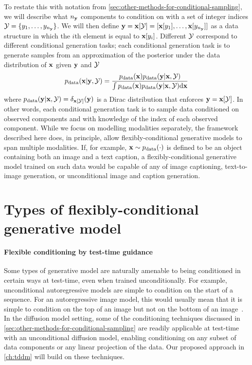 To restate this with notation from \cref{sec:other-methods-for-conditional-sampling}, we will describe what $n_{\mathbf{y}}$ components to condition on with a set of integer indices ${\mathcal{Y}} = \{ y_1, \ldots, y_{n_{\mathbf{y}}} \}$. We will then define ${\mathbf{y}} = {\mathbf{x}}[{\mathcal{Y}}] = [ {\mathbf{x}}[y_1], \ldots, {\mathbf{x}}[y_{n_{\mathbf{y}}}] ]$ as a data structure in which the $i$th element is equal to ${\mathbf{x}}[y_i]$. Different ${\mathcal{Y}}$ correspond to different conditional generation tasks; each conditional generation task is to generate samples from an approximation of the posterior under the data distribution of ${\mathbf{x}}$ given ${\mathbf{y}}$ and ${\mathcal{Y}}$
\begin{equation} \label{eq:flexible-diffusion-target}
    p_{\rm{data}}({\mathbf{x}} | {\mathbf{y}}, {\mathcal{Y}}) = \frac{p_{\rm{data}}({\mathbf{x}})p_{\rm{data}}({\mathbf{y}}|{\mathbf{x}},{\mathcal{Y}})}{\int p_{\rm{data}}({\mathbf{x}})p_{\rm{data}}({\mathbf{y}}|{\mathbf{x}},{\mathcal{Y}}) \mathrm{d}{\mathbf{x}}} 
\end{equation}
where $p_{\rm{data}}({\mathbf{y}}|{\mathbf{x}},{\mathcal{Y}}) = \delta_{{\mathbf{x}}[{\mathcal{Y}}]}({\mathbf{y}})$ is a Dirac distribution that enforces ${\mathbf{y}} = {\mathbf{x}}[{\mathcal{Y}}]$.
In other words, each conditional generation task is to sample data conditioned on observed components and with knowledge of the index of each observed component. 
%
While we focus on modelling modalities separately, the framework described here does, in principle, allow flexibly-conditional generative models to span multiple modalities. If, for example, ${\mathbf{x}} \sim p_{\rm{data}}(\cdot)$ is defined to be an object containing both an image and a text caption, a flexibly-conditional generative model trained on such data would be capable of any of image captioning, text-to-image generation, or unconditional image and caption generation.


\section{Types of flexibly-conditional generative model}
\paragraph{Flexible conditioning by test-time guidance}
Some types of generative model are naturally amenable to being conditioned in certain ways at test-time, even when trained unconditionally. For example, unconditional autoregressive models are simple to condition on the start of a sequence. For an autoregressive image model, this would usually mean that it is simple to condition on the top of an image but not on the bottom of an image~\citep{van2016pixel}. In the diffusion model setting, some of the conditioning techniques discussed in \cref{sec:other-methods-for-conditional-sampling} are readily applicable at test-time with an unconditional diffusion model, enabling conditioning on any subset of data components or any linear projection of the data. Our proposed approach in \cref{ch:tddm} will build on these techniques.

